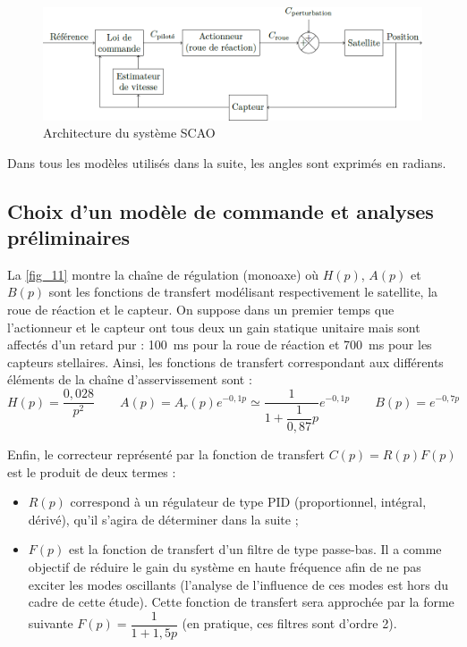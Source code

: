 \begin{figure}[H]
\centering
\includegraphics[width=.8\linewidth]{images/fig_10}
\caption{Architecture du système SCAO \label{fig_10}}
\end{figure}

Dans tous les modèles utilisés dans la suite, les angles sont exprimés en radians.

\fi

\subsection{\label{sec:3:A} Choix d’un modèle de commande et analyses préliminaires}

\ifprof
\else


La  \autoref{fig_11} montre la chaîne de régulation (monoaxe) où $H(p)$, $A(p)$ et $B(p)$ sont les fonctions de transfert modélisant respectivement le satellite, la roue de réaction et le capteur. On suppose dans un premier temps que l’actionneur et le capteur ont tous deux un gain statique unitaire mais sont affectés d’un retard pur : \SI{100}{ms} pour la roue de réaction et \SI{700}{ms} pour les capteurs stellaires. 
Ainsi, les fonctions de transfert correspondant aux différents éléments de la chaîne d’asservissement sont :
$$
H(p)=\dfrac{0,028}{p^2} 
\quad \quad 
A(p)=A_r (p) e^{-0,1p}\simeq \dfrac{1}{1+\dfrac{1}{0,87}p}e^{-0,1 p} 
\quad \quad 
B(p)=e^{-0,7p}
$$


Enfin, le correcteur représenté par la fonction de transfert $C(p) = R(p) F(p)$ est le produit de deux termes :
\begin{itemize}
\item $R(p)$ correspond à un régulateur de type PID (proportionnel, intégral, dérivé), qu’il s’agira de déterminer
dans la suite ;
\item $F(p)$ est la fonction de transfert d’un filtre de type passe-bas. Il a comme objectif de réduire le gain du système
en haute fréquence afin de ne pas exciter les modes oscillants (l’analyse de l’influence de ces modes est hors
du cadre de cette étude). Cette fonction de transfert sera approchée par la forme suivante 
$F(p) = \dfrac{1}{1 + 1,5p}$ (en pratique, ces filtres sont d’ordre 2).
\end{itemize}
\fi

